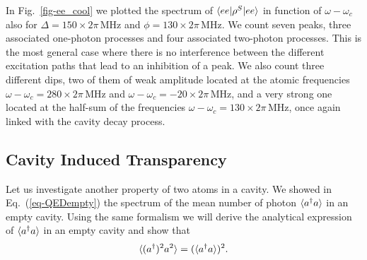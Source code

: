 In Fig.~\ref{fig-ee_cool} we plotted the spectrum of $\langle ee | \rho^S | ee \rangle$ in function of $\omega-\omega_c$ also for $\Delta=150\times 2\pi\,\mbox{MHz}$ and $\phi = 130\times 2\pi\,\mbox{MHz}$. We count seven peaks, three associated one-photon processes and four associated two-photon processes. This is the most general case where there is no interference between the different excitation paths that lead to an inhibition of a peak. We also count three different dips, two of them of weak amplitude located at the atomic frequencies $\omega-\omega_c=280\times 2\pi\,\mbox{MHz}$ and $\omega-\omega_c=-20\times 2\pi\,\mbox{MHz}$, and a very strong one located at the half-sum of the frequencies $\omega - \omega_c = 130\times 2\pi\,\mbox{MHz}$, once again linked with the cavity decay process.  

\subsection{Cavity Induced Transparency}

Let us investigate another property of two atoms in a cavity. We showed in Eq.~(\ref{eq-QEDempty}) the spectrum of the mean number of photon $\langle a^\dagger a \rangle$ in an empty cavity. Using the same formalism we will derive the analytical expression of $\langle a^\dagger a \rangle$ in an empty cavity and show that
\[\langle (a^\dagger)^2 a^2 \rangle=(\langle a^\dagger a \rangle)^2.\]

